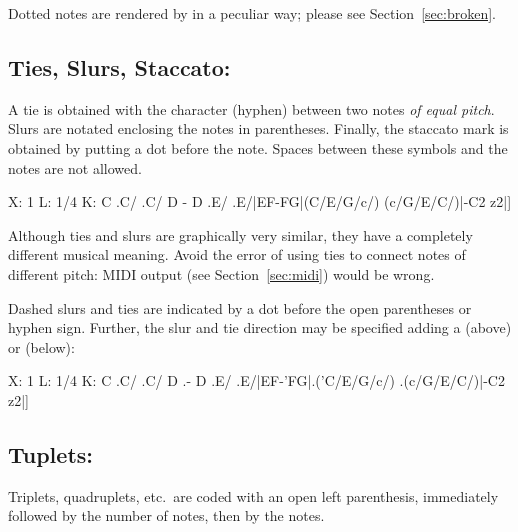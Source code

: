 \documentclass[a4paper,12pt]{book}
\begin{document}

\begin{note}
  
  Dotted notes are rendered by \abcmid{} in a peculiar way; please see
  Section~\ref{sec:broken}.
  
\end{note}


\subsection{Ties, Slurs, Staccato: }

A tie is obtained with the character \car{-} (hyphen) between two
notes \emph{of equal pitch}. Slurs are notated enclosing the notes in
parentheses. Finally, the staccato mark is obtained by putting a dot
before the note. Spaces between these symbols and the notes are not
allowed.

\begin{abcsource}
X: 1
L: 1/4
K: C
.C/ .C/ D - D .E/ .E/|EF-FG|(C/E/G/c/) (c/G/E/C/)|-C2 z2|]
\end{abcsource}


\begin{note}

  Although ties and slurs are graphically very similar, they have a
  completely different musical meaning. Avoid the error of using ties
  to connect notes of different pitch: MIDI output (see
  Section~\ref{sec:midi}) would be wrong.

\end{note}

Dashed slurs and ties are indicated by a dot before the open
parentheses or hyphen sign. Further, the slur and tie direction may be
specified adding a  (above) or \car{,} (below):

\begin{abcsource}
X: 1
L: 1/4
K: C
.C/ .C/ D .- D .E/ .E/|EF-'FG|.('C/E/G/c/) .(c/G/E/C/)|-C2 z2|]
\end{abcsource}



\subsection{Tuplets: }

Triplets, quadruplets, etc.\ are coded with an open left parenthesis,
immediately followed by the number of notes, then by the notes.
\end{document}
